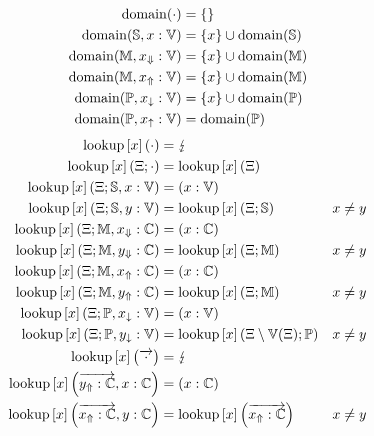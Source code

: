 \newcommand{\Fail}{\lightning}
\newcommand{\Lookup}[2]{\operatorname{lookup}\left[#1\right]\left(#2\right)}
\newcommand{\Domain}{\operatorname{domain}}
\begin{equation*}
\begin{aligned}
\Domain(\cdot) &= \{\}\\
\Domain(\Scope, x : \Var) &= \{x\} \cup \Domain(\Scope)\\
\Domain(\Module, \Private{x} : \Var) &= \{x\} \cup \Domain(\Module)\\
\Domain(\Module, \Public{x} : \Var) &= \{x\} \cup \Domain(\Module)\\
\Domain(\Pattern, \private{x} : \Var) &= \{x\} \cup \Domain(\Pattern)\\
\Domain(\Pattern, \public{x} : \Var) &= \Domain(\Pattern)
\end{aligned}
\end{equation*}
\begin{equation*}
\begin{aligned}
\Lookup{x}{\cdot} &= \Fail\\
\Lookup{x}{\Env; \cdot} &= \Lookup{x}{\Env}\\
\Lookup{x}{\Env; \Scope, x : \Var} &= (x : \Var)\\
\Lookup{x}{\Env; \Scope, y : \Var} &= \Lookup{x}{\Env; \Scope} & x \neq y\\
\Lookup{x}{\Env; \Module, \Private{x} : \Constant} &= (x : \Constant)\\
\Lookup{x}{\Env; \Module, \Private{y} : \Constant} &= \Lookup{x}{\Env; \Module} & x \neq y\\
\Lookup{x}{\Env; \Module, \Public{x} : \Constant} &= (x : \Constant)\\
\Lookup{x}{\Env; \Module, \Public{y} : \Constant} &= \Lookup{x}{\Env; \Module} & x \neq y\\
\Lookup{x}{\Env; \Pattern, \private{x} : \Var} &= (x : \Var)\\
\Lookup{x}{\Env; \Pattern, \private{y} : \Var} &= \Lookup{x}{\Env \setminus \Var(\Env); \Pattern} & x \neq y\\
\Lookup{x}{\overrightarrow{\cdot}} &= \Fail\\
\Lookup{x}{\overrightarrow{\Public{y} : \Constant}, x : \Constant} &= (x : \Constant)\\
\Lookup{x}{\overrightarrow{\Public{x} : \Constant}, y : \Constant} &= \Lookup{x}{\overrightarrow{\Public{x} : \Constant}} & x \neq y
\end{aligned}
\end{equation*}
